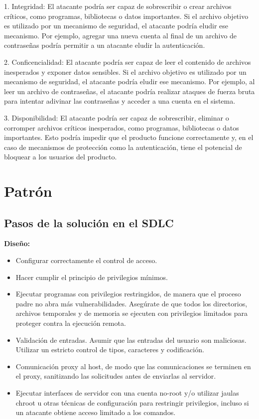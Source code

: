 1. Integridad: El atacante podría ser capaz de sobrescribir o crear archivos críticos, como programas, bibliotecas o datos importantes. Si el archivo objetivo es utilizado por un mecanismo de seguridad, el atacante podría eludir ese mecanismo. Por ejemplo, agregar una nueva cuenta al final de un archivo de contraseñas podría permitir a un atacante eludir la autenticación.

2. Conficencialidad: El atacante podría ser capaz de leer el contenido de archivos inesperados y exponer datos sensibles. Si el archivo objetivo es utilizado por un mecanismo de seguridad, el atacante podría eludir ese mecanismo. Por ejemplo, al leer un archivo de contraseñas, el atacante podría realizar ataques de fuerza bruta para intentar adivinar las contraseñas y acceder a una cuenta en el sistema.

3. Disponibilidad: El atacante podría ser capaz de sobrescribir, eliminar o corromper archivos críticos inesperados, como programas, bibliotecas o datos importantes. Esto podría impedir que el producto funcione correctamente y, en el caso de mecanismos de protección como la autenticación, tiene el potencial de bloquear a los usuarios del producto.


\section{Patrón}

\subsection*{Pasos de la solución en el SDLC}

\textbf{Diseño:}

\begin{itemize}
    \item Configurar correctamente el control de acceso.
    \item Hacer cumplir el principio de privilegios mínimos.
    \item Ejecutar programas con privilegios restringidos, de manera que el proceso padre no abra más vulnerabilidades. Asegúrate de que todos los directorios, archivos temporales y de memoria se ejecuten con privilegios limitados para proteger contra la ejecución remota.
    \item Validación de entradas. Asumir que las entradas del usuario son maliciosas. Utilizar un estricto control de tipos, caracteres y codificación.
    \item Comunicación proxy al host, de modo que las comunicaciones se terminen en el proxy, sanitizando las solicitudes antes de enviarlas al servidor.
    \item Ejecutar interfaces de servidor con una cuenta no-root y/o utilizar jaulas chroot u otras técnicas de configuración para restringir privilegios, incluso si un atacante obtiene acceso limitado a los comandos.
\end{itemize}

